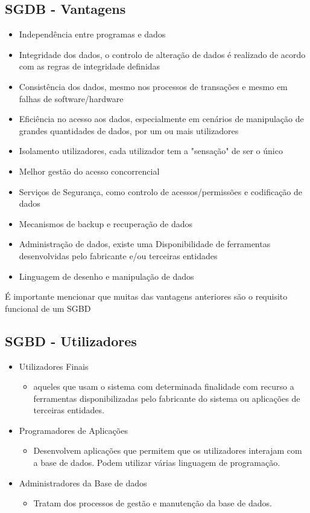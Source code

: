 \documentclass{easyclass}
\begin{document}
\subsection{SGDB - Vantagens}
\begin{itemize}
\item Independência entre programas e dados
\item Integridade dos dados,  o controlo de alteração de dados é realizado de acordo com as regras de integridade definidas
\item Consistência dos dados,  mesmo nos processos de transações e mesmo em falhas de software/hardware
\item Eficiência no acesso aos dados,  especialmente em cenários de manipulação de grandes quantidades de dados, por um ou mais utilizadores
\item Isolamento utilizadores, cada utilizador tem a "sensação" de ser o único
\item Melhor gestão do acesso concorrencial
\item Serviços de Segurança, como controlo de acessos/permissões e codificação de dados
\item Mecanismos de backup e recuperação de dados
\item Administração de dados, existe uma Disponibilidade de ferramentas desenvolvidas pelo fabricante e/ou terceiras entidades
\item Linguagem de desenho e manipulação de dados
\end{itemize}
É importante mencionar que muitas das vantagens anteriores são o requisito funcional de um SGBD
\subsection{SGBD - Utilizadores}
\begin{itemize}
    \item Utilizadores Finais
    
    \begin{itemize}
        \item aqueles que usam o sistema com determinada finalidade com recurso a ferramentas disponibilizadas pelo fabricante do sistema ou aplicações de terceiras entidades.
    \end{itemize}

    \item Programadores de Aplicações
    
    \begin{itemize}
        \item Desenvolvem aplicações que permitem que os utilizadores interajam com a base de dados. Podem utilizar várias linguagem de programação.
    \end{itemize}
    
    \item Administradores da Base de dados
    
    \begin{itemize}
        \item Tratam dos processos de gestão e manutenção da base de dados.
    \end{itemize}

\end{itemize}
\end{document}
